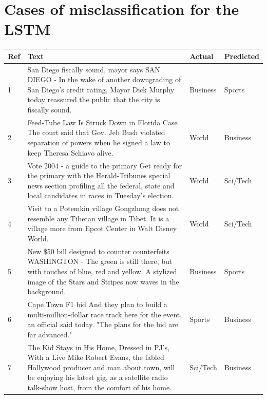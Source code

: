 \documentclass[12pt,a4paper,english]{article}
\begin{document}
\section{Cases of misclassification for the LSTM}
\begin{table}[H]
\begin{longtable}{| m{2em} | m{25em} | m{5em} | m{5em} |}
        \hline
        \textbf{Ref} & \textbf{Text} & \textbf{Actual} & \textbf{Predicted} \\ \hline
        1 & San Diego fiscally sound, mayor says SAN DIEGO - In the wake of another downgrading of San Diego's credit rating, Mayor Dick Murphy today reassured the public that the city is fiscally sound. & Business & Sports \\ \hline
        
        2 & Feed-Tube Law Is Struck Down in Florida Case The court said that Gov. Jeb Bush violated separation of powers when he signed a law to keep Theresa Schiavo alive. & World & Business \\ \hline
        
        3 & Vote 2004 - a guide to the primary Get ready for the primary with the Herald-Tribunes special news section profiling all the federal, state and local candidates in races in Tuesday's election. & World & Sci/Tech \\ \hline
        
        4 & Visit to a Potemkin village Gongzhong does not resemble any Tibetan village in Tibet. It is a village more from Epcot Center in Walt Disney World. & World & Sci/Tech \\ \hline
        
        5 & New \$50 bill designed to counter counterfeits WASHINGTON - The green is still there, but with touches of blue, red and yellow. A stylized image of the Stars and Stripes now waves in the background. & Business & Sports \\ \hline
        
        6 & Cape Town F1 bid And they plan to build a multi-million-dollar race track here for the event, an official said today. "The plans for the bid are far advanced." & Sports & Business \\ \hline
        
        7 & The Kid Stays in His Home, Dressed in PJ's, With a Live Mike Robert Evans, the fabled Hollywood producer and man about town, will be enjoying his latest gig, as a satellite radio talk-show host, from the comfort of his home. & Sci/Tech & Business \\ \hline
        

\end{longtable}
\end{table}
\end{document}
